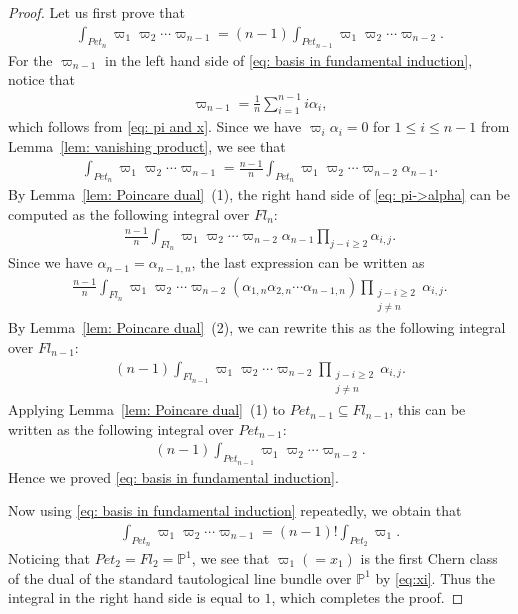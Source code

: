 \documentclass[11pt]{article}
\theoremstyle{definition}
\numberwithin{equation}{section}
\numberwithin{equation}{section}
\begin{document}
\begin{proof}
Let us first prove that
\begin{align}\label{eq: basis in fundamental induction}
\int_{Pet_{n}}\varpi_1\varpi_2\cdots \varpi_{n-1} 
= (n-1) \int_{Pet_{n-1}}\varpi_1\varpi_2\cdots \varpi_{n-2}.
\end{align}
For the $\varpi_{n-1}$ in the left hand side of \eqref{eq: basis in fundamental induction}, notice that
\begin{align*}
\varpi_{n-1} = \frac{1}{n}\sum_{i=1}^{n-1} i\alpha_i ,
\end{align*}
which follows from \eqref{eq: pi and x}. Since we have $\varpi_i\alpha_i=0$ for $1\le i\le n-1$ from Lemma~\ref{lem: vanishing product}, we see that
\begin{align}\label{eq: pi->alpha}
\int_{Pet_{n}}\varpi_1\varpi_2\cdots \varpi_{n-1}
= \frac{n-1}{n}\int_{Pet_{n}}\varpi_1\varpi_2\cdots \varpi_{n-2}\alpha_{n-1}.
\end{align}
By Lemma~\ref{lem: Poincare dual}~(1), the right hand side of \eqref{eq: pi->alpha} can be computed as the following integral over $Fl_n$:
\begin{align*}
\frac{n-1}{n}\int_{Fl_n} \varpi_1\varpi_2\cdots \varpi_{n-2}\alpha_{n-1} \prod_{j-i\ge2}\alpha_{i,j}.
\end{align*}
Since we have $\alpha_{n-1}=\alpha_{n-1,n}$, the last expression can be written as
\begin{align*}
\frac{n-1}{n}\int_{Fl_n} \varpi_1\varpi_2\cdots \varpi_{n-2} (\alpha_{1,n}\alpha_{2,n}\cdots\alpha_{n-1,n})\prod_{\substack{j-i\ge2\\j\ne n}}\alpha_{i, j}.
\end{align*}
By Lemma~\ref{lem: Poincare dual}~(2), we can rewrite this as the following integral over $Fl_{n-1}$:
\begin{align*}
(n-1)\int_{Fl_{n-1}} \varpi_1\varpi_2\cdots \varpi_{n-2} \prod_{\substack{j-i\ge2\\j\ne n}}\alpha_{i, j}.
\end{align*}
Applying Lemma~\ref{lem: Poincare dual}~(1) to $Pet_{n-1}\subseteq Fl_{n-1}$, this can be written as the following integral over $Pet_{n-1}$:
\begin{align*}
(n-1)\int_{Pet_{n-1}} \varpi_1\varpi_2\cdots \varpi_{n-2} .
\end{align*}
Hence we proved \eqref{eq: basis in fundamental induction}.

Now using \eqref{eq: basis in fundamental induction} repeatedly, we obtain that
\begin{align*}
\int_{Pet_{n}}\varpi_1\varpi_2\cdots \varpi_{n-1}
= (n-1)! \int_{Pet_{2}}\varpi_1 .
\end{align*}
Noticing that $Pet_{2}=Fl_2={\mathbb P}^1$, we see that $\varpi_1(=x_1)$ is the first Chern class of the dual of the standard tautological line bundle over ${\mathbb P}^1$ by \eqref{eq:xi}. Thus the integral in the right hand side is equal to $1$, which completes the proof.
\end{proof}
\end{document}
